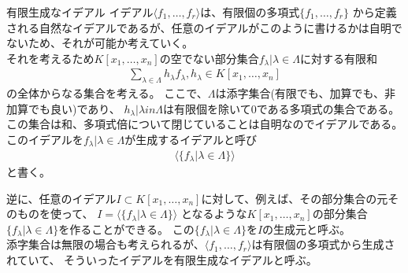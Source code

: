 \begin{frame} {有限生成なイデアル}
	イデアル$\langle f_1, \ldots, f_r \rangle$は、有限個の多項式$\{ f_1, \ldots, f_r \}$
	から定義される自然なイデアルであるが、任意のイデアルがこのように書けるかは自明でないため、それが可能か考えていく。\\
	それを考えるため$K[x_1, \ldots, x_n]$の空でない部分集合${f_{\lambda} | \lambda \in \Lambda}$に対する有限和
	\begin{align*}
		\sum_{\lambda \in \Lambda} h_{\lambda} f_{\lambda}, h_{\lambda} \in K[x_1, \ldots, x_n]
	\end{align*}
	の全体からなる集合を考える。
	ここで、$\Lambda$は添字集合(有限でも、加算でも、非加算でも良い)であり、
	${h_{\lambda} | \lambda in \Lambda}$は有限個を除いて0である多項式の集合である。\\
	この集合は和、多項式倍について閉じていることは自明なのでイデアルである。\\
	このイデアルを${f_{\lambda}|\lambda \in \Lambda}$が生成するイデアルと呼び
	\begin{align*}
		\langle \{ f_{\lambda} | \lambda \in \Lambda \} \rangle
	\end{align*}
	と書く。
\end{frame}

\begin{frame}
	逆に、任意のイデアル$I \subset K[x_1, \ldots, x_n]$に対して、例えば、その部分集合の元そのものを使って、
	$I=\langle \{  f_{\lambda} | \lambda \in \Lambda \} \rangle$
	となるような$K[x_1, \ldots, x_n]$の部分集合$\{ f_{\lambda} | \lambda \in \Lambda \}$を作ることができる。
	この$\{ f_{\lambda} | \lambda \in \Lambda \}$を$I$の生成元と呼ぶ。\\
	添字集合は無限の場合も考えられるが、$\langle f_1, \ldots, f_r \rangle$は有限個の多項式から生成されていて、
	そういったイデアルを有限生成なイデアルと呼ぶ。\\
\end{frame}

